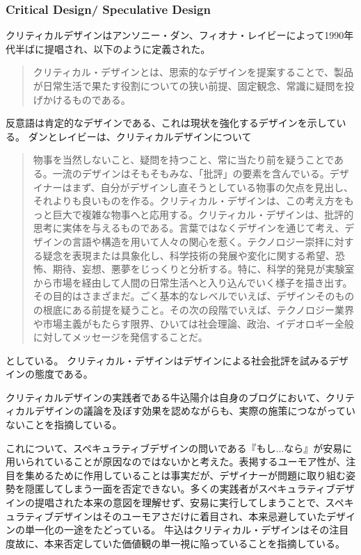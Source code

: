 \documentclass{jsarticle}
\begin{document}
\subsubsection{Critical Design/ Speculative Design}
クリティカルデザインはアンソニー・ダン、フィオナ・レイビーによって1990年代半ばに提唱され、以下のように定義された。
\begin{quotation}
  クリティカル・デザインとは、思索的なデザインを提案することで、製品が日常生活で果たす役割についての狭い前提、固定観念、常識に疑問を投げかけるものである。
\end{quotation}
反意語は肯定的なデザインである、これは現状を強化するデザインを示している。
ダンとレイビーは、クリティカルデザインについて
\begin{quotation}
  物事を当然しないこと、疑問を持つこと、常に当たり前を疑うことである。一流のデザインはそもそもみな、「批評」の要素を含んでいる。デザイナーはまず、自分がデザインし直そうとしている物事の欠点を見出し、それよりも良いものを作る。クリティカル・デザインは、この考え方をもっと巨大で複雑な物事へと応用する。クリティカル・デザインは、批評的思考に実体を与えるものである。言葉ではなくデザインを通じて考え、デザインの言語や構造を用いて人々の関心を惹く。テクノロジー崇拝に対する疑念を表現または具象化し、科学技術の発展や変化に関する希望、恐怖、期待、妄想、悪夢をじっくりと分析する。特に、科学的発見が実験室から市場を経由して人間の日常生活へと入り込んでいく様子を描き出す。その目的はさまざまだ。ごく基本的なレベルでいえば、デザインそのものの根底にある前提を疑うこと。その次の段階でいえば、テクノロジー業界や市場主義がもたらす限界、ひいては社会理論、政治、イデオロギー全般に対してメッセージを発信することだ。
\end{quotation}
としている。
クリティカル・デザインはデザインによる社会批評を試みるデザインの態度である。

クリティカルデザインの実践者である牛込陽介は自身のブログ\cite{ushigome}において、クリティカルデザインの議論を及ぼす効果を認めながらも、実際の施策につながっていないことを指摘している。

これについて、スペキュラティブデザインの問いである『もし...なら』が安易に用いられていることが原因なのではないかと考えた。表掲するユーモア性が、注目を集めるために作用していることは事実だが、デザイナーが問題に取り組む姿勢を隠匿してしまう一面を否定できない。多くの実践者がスペキュラティブデザインの提唱された本来の意図を理解せず、安易に実行してしまうことで、スペキュラティブデザインはそのユーモアさだけに着目され、本来忌避していたデザインの単一化の一途をたどっている。
牛込\cite{ushigome}はクリティカル・デザインはその注目度故に、本来否定していた価値観の単一視に陥っていることを指摘している。
\end{document}

